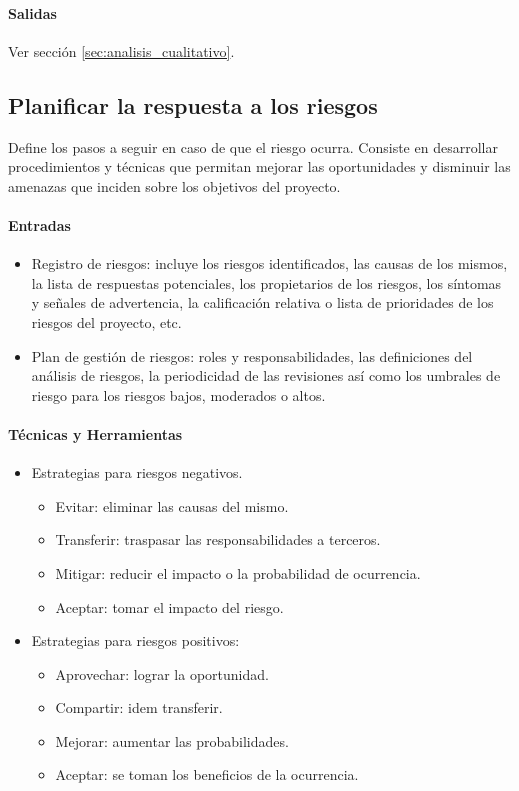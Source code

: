 \documentclass[a4paper,twosides]{article}
\newlength{\wideitemsep}
\let\olditem\item
\renewcommand{\item}{\setlength{\itemsep}{\wideitemsep}\olditem}
\begin{document}
\paragraph{Salidas}
Ver sección \ref{sec:analisis_cualitativo}.

\subsection{Planificar la respuesta a los riesgos} \label{sec:planificar_respuesta_riesgos}
Define los pasos a seguir en caso de que el riesgo ocurra. Consiste en desarrollar procedimientos y técnicas que permitan mejorar las oportunidades y disminuir las amenazas que inciden sobre los objetivos del proyecto.

\paragraph{Entradas}
\begin{itemize}
\item Registro de riesgos: incluye los riesgos identificados, las causas de los mismos, la lista de respuestas potenciales, los propietarios de los riesgos, los síntomas y señales de advertencia, la calificación relativa o lista de prioridades de los riesgos del proyecto, etc.
\item Plan de gestión de riesgos: roles y responsabilidades, las definiciones del análisis de riesgos, la periodicidad de las revisiones así como los umbrales de riesgo para los riesgos bajos, moderados o altos.
\end{itemize}

\paragraph{Técnicas y Herramientas}
\begin{itemize}
\item Estrategias para riesgos negativos.
\begin{itemize}
\item Evitar: eliminar las causas del mismo.
\item Transferir: traspasar las responsabilidades a terceros.
\item Mitigar: reducir el impacto o la probabilidad de ocurrencia.
\item Aceptar: tomar el impacto del riesgo.
\end{itemize}
\item Estrategias para riesgos positivos:
\begin{itemize}
\item Aprovechar: lograr la oportunidad.
\item Compartir: idem transferir.
\item Mejorar: aumentar las probabilidades.
\item Aceptar: se toman los beneficios de la ocurrencia.
\end{itemize}
\end{itemize}
\end{document}
